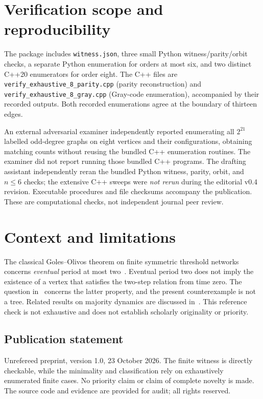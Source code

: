 \documentclass[11pt,a4paper]{article}
\begin{document}
\section{Verification scope and reproducibility}
The package includes \texttt{witness.json}, three small Python witness/parity/orbit checks, a separate Python enumeration for orders at most six, and two distinct C++20 enumerators for order eight. The C++ files are \texttt{verify\_exhaustive\_8\_parity.cpp} (parity reconstruction) and \texttt{verify\_exhaustive\_8\_gray.cpp} (Gray-code enumeration), accompanied by their recorded outputs. Both recorded enumerations agree at the boundary of thirteen edges.

An external adversarial examiner independently reported enumerating all $2^{21}$ labelled odd-degree graphs on eight vertices and their configurations, obtaining matching counts without reusing the bundled C++ enumeration routines. The examiner did not report running those bundled C++ programs. The drafting assistant independently reran the bundled Python witness, parity, orbit, and $n\leq6$ checks; the extensive C++ sweeps were \emph{not rerun} during the editorial v0.4 revision. Executable procedures and file checksums accompany the publication. These are computational checks, not independent journal peer review.

\section{Context and limitations}
The classical Goles--Olivos theorem on finite symmetric threshold networks concerns \emph{eventual} period at most two~\cite{GO}. Eventual period two does not imply the existence of a vertex that satisfies the two-step relation from time zero. The question in~\cite[\S6]{BZZ} concerns the latter property, and the present counterexample is not a tree. Related results on majority dynamics are discussed in~\cite{BCT,GH,GS,MRW}. This reference check is not exhaustive and does not establish scholarly originality or priority.

\subsection*{Publication statement}
Unrefereed preprint, version 1.0, 23 October 2026. The finite witness is directly checkable, while the minimality and classification rely on exhaustively enumerated finite cases. No priority claim or claim of complete novelty is made. The source code and evidence are provided for audit; all rights reserved.
\end{document}
